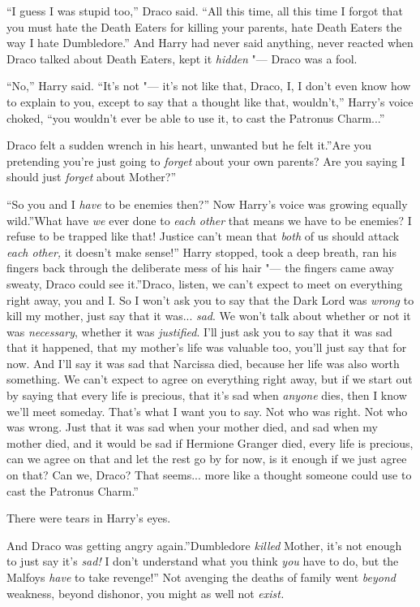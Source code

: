 ``I guess I was stupid too,'' Draco said. ``All this time, all this time
I forgot that you must hate the Death Eaters for killing your parents,
hate Death Eaters the way I hate Dumbledore.'' And Harry had never said
anything, never reacted when Draco talked about Death Eaters, kept it
\emph{hidden} "--- Draco was a fool.

``No,'' Harry said. ``It's not "--- it's not like that, Draco, I, I don't
even know how to explain to you, except to say that a thought like that,
wouldn't,'' Harry's voice choked, ``you wouldn't ever be able to use it,
to cast the Patronus Charm...''

Draco felt a sudden wrench in his heart, unwanted but he felt it.''Are
you pretending you're just going to \emph{forget} about your own
parents? Are you saying I should just \emph{forget} about Mother?''

``So you and I \emph{have} to be enemies then?'' Now Harry's voice was
growing equally wild.''What have \emph{we} ever done to \emph{each
other} that means we have to be enemies? I refuse to be trapped like
that! Justice can't mean that \emph{both} of us should attack \emph{each
other,} it doesn't make sense!'' Harry stopped, took a deep breath, ran
his fingers back through the deliberate mess of his hair "--- the fingers
came away sweaty, Draco could see it.''Draco, listen, we can't expect to
meet on everything right away, you and I. So I won't ask you to say that
the Dark Lord was \emph{wrong} to kill my mother, just say that it
was... \emph{sad}. We won't talk about whether or not it was
\emph{necessary}, whether it was \emph{justified}. I'll just ask you to
say that it was sad that it happened, that my mother's life was valuable
too, you'll just say that for now. And I'll say it was sad that Narcissa
died, because her life was also worth something. We can't expect to
agree on everything right away, but if we start out by saying that every
life is precious, that it's sad when \emph{anyone} dies, then I know
we'll meet someday. That's what I want you to say. Not who was right.
Not who was wrong. Just that it was sad when your mother died, and sad
when my mother died, and it would be sad if Hermione Granger died, every
life is precious, can we agree on that and let the rest go by for now,
is it enough if we just agree on that? Can we, Draco? That seems...
more like a thought someone could use to cast the Patronus Charm.''

There were tears in Harry's eyes.

And Draco was getting angry again.''Dumbledore \emph{killed} Mother,
it's not enough to just say it's \emph{sad!} I don't understand what you
think \emph{you} have to do, but the Malfoys \emph{have} to take
revenge!'' Not avenging the deaths of family went \emph{beyond}
weakness, beyond dishonor, you might as well not \emph{exist.}

